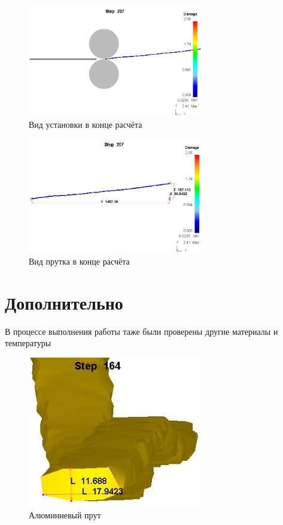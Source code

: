 \documentclass{beamer}
\begin{document}
\begin{frame}{}
\label{1.3}
\begin{figure}[h]
 \includegraphics[width=3in]{img/step207.JPG}
 \footnotesize\caption{Вид установки в конце расчёта}
\end{figure}
\end{frame}

\begin{frame}{}
\label{1.4}
\begin{figure}[h]
 \includegraphics[width=3in]{img/step207_3.JPG}
 \footnotesize\caption{Вид прутка в конце расчёта}
\end{figure}
\end{frame}

\section{Дополнительно}
\begin{frame}{}
В процессе выполнения работы таже были проверены другие материалы и температуры
\begin{figure}[h]
 \includegraphics[width=3in]{img/164_2.JPG}
 \footnotesize\caption{Алюминиевый прут}
\end{figure}
\end{frame}
\end{document}
